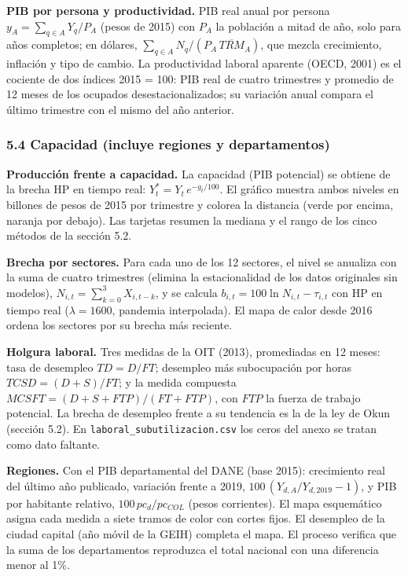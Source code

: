 \textbf{PIB por persona y productividad.} PIB real anual por persona
\(y_A=\sum_{q\in A}Y_q/P_A\) (pesos de 2015) con \(P_A\) la población a
mitad de año, solo para años completos; en dólares,
\(\sum_{q\in A}N_q/(P_A\,\overline{TRM}_A)\), que mezcla crecimiento,
inflación y tipo de cambio. La productividad laboral aparente (OECD,
2001) es el cociente de dos índices 2015 = 100: PIB real de cuatro
trimestres y promedio de 12 meses de los ocupados desestacionalizados;
su variación anual compara el último trimestre con el mismo del año
anterior.

\hypertarget{capacidad-incluye-regiones-y-departamentos}{%
\subsubsection{5.4 Capacidad (incluye regiones y
departamentos)}\label{capacidad-incluye-regiones-y-departamentos}}

\textbf{Producción frente a capacidad.} La capacidad (PIB potencial) se
obtiene de la brecha HP en tiempo real: \(Y^*_t=Y_t\,e^{-g_t/100}\). El
gráfico muestra ambos niveles en billones de pesos de 2015 por trimestre
y colorea la distancia (verde por encima, naranja por debajo). Las
tarjetas resumen la mediana y el rango de los cinco métodos de la
sección 5.2.

\textbf{Brecha por sectores.} Para cada uno de los 12 sectores, el nivel
se anualiza con la suma de cuatro trimestres (elimina la estacionalidad
de los datos originales sin modelos),
\(N_{i,t}=\sum_{k=0}^{3}X_{i,t-k}\), y se calcula
\(b_{i,t}=100\ln N_{i,t}-\tau_{i,t}\) con HP en tiempo real
(\(\lambda=1600\), pandemia interpolada). El mapa de calor desde 2016
ordena los sectores por su brecha más reciente.

\textbf{Holgura laboral.} Tres medidas de la OIT (2013), promediadas en
12 meses: tasa de desempleo \(TD=D/FT\); desempleo más subocupación por
horas \(TCSD=(D+S)/FT\); y la medida compuesta
\(MCSFT=(D+S+FTP)/(FT+FTP)\), con \(FTP\) la fuerza de trabajo
potencial. La brecha de desempleo frente a su tendencia es la de la ley
de Okun (sección 5.2). En \texttt{laboral\_subutilizacion.csv} los ceros
del anexo se tratan como dato faltante.

\textbf{Regiones.} Con el PIB departamental del DANE (base 2015):
crecimiento real del último año publicado, variación frente a 2019,
\(100\,(Y_{d,A}/Y_{d,2019}-1)\), y PIB por habitante relativo,
\(100\,pc_d/pc_{COL}\) (pesos corrientes). El mapa esquemático asigna
cada medida a siete tramos de color con cortes fijos. El desempleo de la
ciudad capital (año móvil de la GEIH) completa el mapa. El proceso
verifica que la suma de los departamentos reproduzca el total nacional
con una diferencia menor al 1\%.

